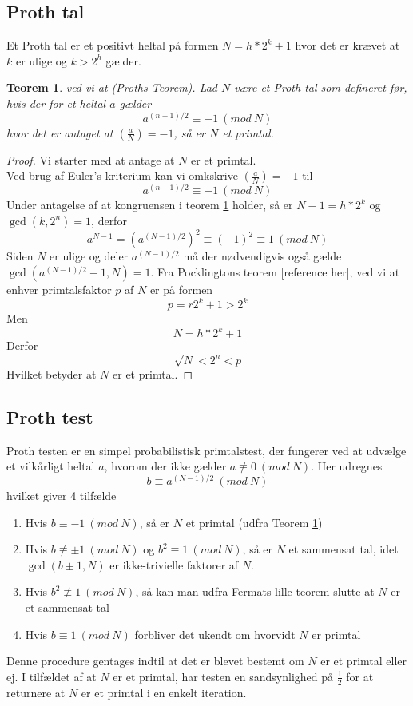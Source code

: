 \documentclass[11pt,a4paper]{article}
\newtheorem{prothTeorem}{Teorem}
\begin{document}
\subsection*{Proth tal}
Et Proth tal er et positivt heltal på formen $N=h*2^k+1$ hvor det er krævet at $k$ er ulige og $k>2^h$ gælder. \\
\begin{prothTeorem}
\label{thm:1}ved vi at
(Proths Teorem). Lad $N$ være et Proth tal som defineret før, hvis der for et heltal $a$ gælder
$$a^{(n-1)/2} \equiv -1\:(mod\:N)$$
hvor det er antaget at $(\frac{a}{N}) = -1$, så er $N$ et primtal.
\end{prothTeorem}
\begin{proof}
Vi starter med at antage at $N$ er et primtal.\\
Ved brug af Euler's kriterium kan vi omkskrive $(\frac{a}{N}) = -1$  til
$$a^{(n-1)/2} \equiv -1\:(mod\:N)$$
Under antagelse af at kongruensen i teorem \ref{thm:1} holder, så er $N-1=h*2^k$ og $\gcd(k,2^n)=1$, derfor
$$a^{N-1}=\left(a^{(N-1)/2} \right)^2 \equiv (-1)^2 \equiv 1\: (mod\: N)$$
Siden $N$ er ulige og deler $a^{(N-1)/2}$ må der nødvendigvis også gælde $\gcd(a^{(N-1)/2}-1,N)=1$. Fra Pocklingtons teorem [reference her], ved vi at enhver primtalsfaktor $p$ af $N$ er på formen
$$p=r2^k+1>2^k$$
Men 
$$N=h*2^k+1$$
Derfor
$$\sqrt{N}<2^n<p$$
Hvilket betyder at $N$ er et primtal.
\end{proof}
\subsection*{Proth test}
Proth testen er en simpel probabilistisk primtalstest, der fungerer ved at udvælge et vilkårligt heltal $a$, hvorom der ikke gælder $a \not \equiv 0\:(mod\:N)$. Her udregnes 
$$b\equiv a^{(N-1)/2}\:(mod\:N)$$
hvilket giver 4 tilfælde
\begin{enumerate}
\item Hvis $b\equiv -1\: (mod\:N)$, så er $N$ et primtal (udfra Teorem \ref{thm:1})
\item Hvis $b\not\equiv \pm 1\: (mod\:N)$ og $b^2\equiv 1\: (mod\:N)$, så er $N$ et sammensat tal, idet $\gcd(b \pm 1,N)$ er ikke-trivielle faktorer af $N$.
\item Hvis $b^2\not\equiv 1\: (mod\:N)$, så kan man udfra Fermats lille teorem slutte at $N$ er et sammensat tal
\item Hvis $b\equiv 1\: (mod\:N)$ forbliver det ukendt om hvorvidt $N$ er primtal
\end{enumerate}
Denne procedure gentages indtil at det er blevet bestemt om $N$ er et primtal eller ej. I tilfældet af at $N$ er et primtal, har testen en sandsynlighed på $\frac{1}{2}$ for at returnere at $N$ er et primtal i en enkelt iteration.
\end{document}
